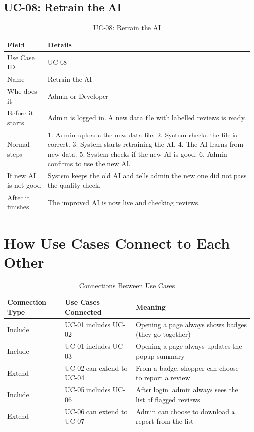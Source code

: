\documentclass[10pt, a4paper]{report}
\begin{document}
\subsection{UC-08: Retrain the AI}

\begin{table}[H]
\centering
\caption{UC-08: Retrain the AI}
\begin{tabularx}{\textwidth}{lX}
\toprule
\textbf{Field} & \textbf{Details} \\
\midrule
Use Case ID & UC-08 \\
Name & Retrain the AI \\
Who does it & Admin or Developer \\
Before it starts & Admin is logged in. A new data file with labelled reviews is ready. \\
Normal steps & 1. Admin uploads the new data file. 2. System checks the file is correct. 3. System starts retraining the AI. 4. The AI learns from new data. 5. System checks if the new AI is good. 6. Admin confirms to use the new AI. \\
If new AI is not good & System keeps the old AI and tells admin the new one did not pass the quality check. \\
After it finishes & The improved AI is now live and checking reviews. \\
\bottomrule
\end{tabularx}
\end{table}

\section{How Use Cases Connect to Each Other}

\begin{table}[H]
\centering
\caption{Connections Between Use Cases}
\begin{tabular}{lll}
\toprule
\textbf{Connection Type} & \textbf{Use Cases Connected} & \textbf{Meaning} \\
\midrule
Include & UC-01 includes UC-02 & Opening a page always shows badges (they go together) \\
Include & UC-01 includes UC-03 & Opening a page always updates the popup summary \\
Extend & UC-02 can extend to UC-04 & From a badge, shopper can choose to report a review \\
Include & UC-05 includes UC-06 & After login, admin always sees the list of flagged reviews \\
Extend & UC-06 can extend to UC-07 & Admin can choose to download a report from the list \\
\bottomrule
\end{tabular}
\end{table}
\end{document}
